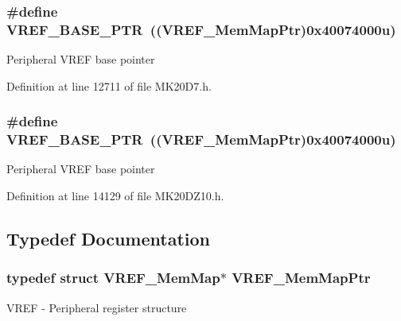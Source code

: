 \subsubsection[{\texorpdfstring{V\+R\+E\+F\+\_\+\+B\+A\+S\+E\+\_\+\+P\+TR}{VREF_BASE_PTR}}]{\setlength{\rightskip}{0pt plus 5cm}\#define V\+R\+E\+F\+\_\+\+B\+A\+S\+E\+\_\+\+P\+TR~(({\bf V\+R\+E\+F\+\_\+\+Mem\+Map\+Ptr})0x40074000u)}\hypertarget{group___v_r_e_f___peripheral_ga53dba79dbefcdd6f788740a6d0caa57d}{}\label{group___v_r_e_f___peripheral_ga53dba79dbefcdd6f788740a6d0caa57d}
Peripheral V\+R\+EF base pointer 

Definition at line 12711 of file M\+K20\+D7.\+h.

\subsubsection[{\texorpdfstring{V\+R\+E\+F\+\_\+\+B\+A\+S\+E\+\_\+\+P\+TR}{VREF_BASE_PTR}}]{\setlength{\rightskip}{0pt plus 5cm}\#define V\+R\+E\+F\+\_\+\+B\+A\+S\+E\+\_\+\+P\+TR~(({\bf V\+R\+E\+F\+\_\+\+Mem\+Map\+Ptr})0x40074000u)}\hypertarget{group___v_r_e_f___peripheral_ga53dba79dbefcdd6f788740a6d0caa57d}{}\label{group___v_r_e_f___peripheral_ga53dba79dbefcdd6f788740a6d0caa57d}
Peripheral V\+R\+EF base pointer 

Definition at line 14129 of file M\+K20\+D\+Z10.\+h.



\subsection{Typedef Documentation}
\subsubsection[{\texorpdfstring{V\+R\+E\+F\+\_\+\+Mem\+Map\+Ptr}{VREF_MemMapPtr}}]{\setlength{\rightskip}{0pt plus 5cm}typedef struct {\bf V\+R\+E\+F\+\_\+\+Mem\+Map}$\ast$ {\bf V\+R\+E\+F\+\_\+\+Mem\+Map\+Ptr}}\hypertarget{group___v_r_e_f___peripheral_ga0730b01086e1d40975ad4e6c1d101b7c}{}\label{group___v_r_e_f___peripheral_ga0730b01086e1d40975ad4e6c1d101b7c}
V\+R\+EF -\/ Peripheral register structure 
